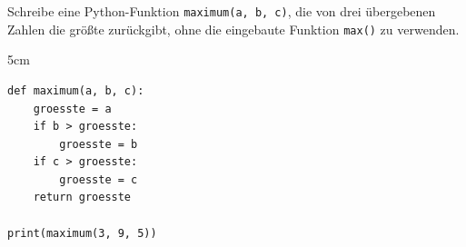 \question[4]
Schreibe eine Python-Funktion \texttt{maximum(a, b, c)}, die von drei übergebenen Zahlen
die größte zurückgibt, ohne die eingebaute Funktion \texttt{max()} zu verwenden.

\begin{solutionbox}{5cm}
\begin{lstlisting}
def maximum(a, b, c):
    groesste = a
    if b > groesste:
        groesste = b
    if c > groesste:
        groesste = c
    return groesste

print(maximum(3, 9, 5))
\end{lstlisting}
\end{solutionbox}
